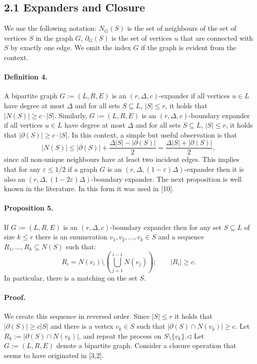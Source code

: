 \subsection*{2.1 Expanders and Closure}
We use the following notation: $N_G(S)$ is the set of neighbours of the set of vertices $S$ in the graph $G$, $\partial_G(S)$ is the set of vertices $u$ that are connected with $S$ by exactly one edge. We omit the index $G$ if the graph is evident from the context.
\paragraph{Definition 4.} A bipartite graph $G:=(L,R,E)$ is an $(r,\Delta,c)$-expander if all vertices $u\in L$ have degree at most $\Delta$ and for all sets $S\subseteq L$, $|S|\leq r$, it holds that $|N(S)|\geq c\cdot|S|$. Similarly, $G:=(L,R,E)$ is an $(r,\Delta,c)$-boundary expander if all vertices $u\in L$ have degree at most $\Delta$ and for all sets $S\subseteq L$, $|S|\leq r$, it holds that $|\partial(S)|\geq c\cdot|S|$.
In this context, a simple but useful observation is that
\[|N(S)|\leq|\partial(S)|+\frac{\Delta|S|-|\partial(S)|}2=\frac{\Delta|S|+|\partial(S)|}2,\]
since all non-unique neighbours have at least two incident edges. This implies that for any $\varepsilon\leq1/2$ if a graph $G$ is an $(r,\Delta,(1-\varepsilon)\Delta)$-expander then it is also an $(r,\Delta,(1-2\varepsilon)\Delta)$-boundary expander.
The next proposition is well known in the literature. In this form it was used in [10].
\paragraph{Proposition 5.} If $G:=(L,R,E)$ is an $(r,\Delta,c)$-boundary expander then for any set $S\subseteq L$ of size $k\leq r$ there is an enumeration $v_1,v_2,\ldots,v_k\in S$ and a sequence $R_1,\ldots,R_k\subseteq N(S)$ such that:
\[R_i=N(v_i)\setminus\left(\bigcup_{j=1}^{i-1}N(v_j)\right);\qquad|R_i|\geq c.\]
In particular, there is a matching on the set $S$.
\paragraph{Proof.} We create this sequence in reversed order. Since $|S|\leq r$ it holds that $|\partial(S)|\geq c|S|$ and there is a vertex $v_k\in S$ such that $|\partial(S)\cap N(v_k)|\geq c$. Let $R_k:=|\partial(S)\cap N(v_k)|$, and repeat the process on $S\setminus\{v_k\}$.\hfill$\triangleleft$
Let $G:=(L,R,E)$ denote a bipartite graph. Consider a closure operation that seems to have originated in [3,2].
